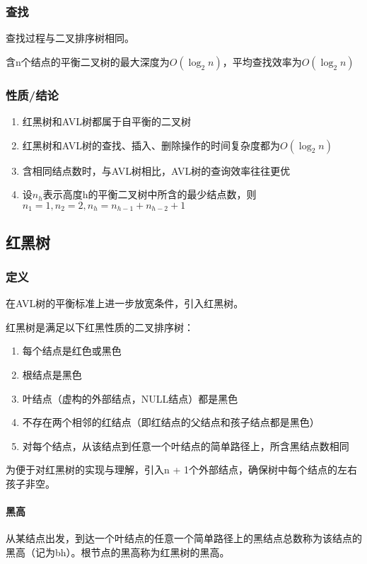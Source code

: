 \subsubsection{查找}
查找过程与二叉排序树相同。

含n个结点的平衡二叉树的最大深度为\(O(\log_2n)\)，平均查找效率为\(O(\log_2n)\)

\subsubsection{性质/结论}
\begin{enumerate}
    \item 红黑树和AVL树都属于自平衡的二叉树
    \item 红黑树和AVL树的查找、插入、删除操作的时间复杂度都为\(O(\log_2n)\)
    \item 含相同结点数时，与AVL树相比，AVL树的查询效率往往更优
    \item 设\(n_h\)表示高度h的平衡二叉树中所含的最少结点数，则\(n_1 = 1, n_2 = 2, n_h = n_{h - 1} + n_{h - 2} + 1\)
\end{enumerate}


\subsection{红黑树}\label{红黑树}
\subsubsection{定义}
在AVL树的平衡标准上进一步放宽条件，引入红黑树。

红黑树是满足以下红黑性质的二叉排序树：
\begin{enumerate}
    \item 每个结点是红色或黑色
    \item 根结点是黑色
    \item 叶结点（虚构的外部结点，NULL结点）都是黑色
    \item 不存在两个相邻的红结点（即红结点的父结点和孩子结点都是黑色）
    \item 对每个结点，从该结点到任意一个叶结点的简单路径上，所含黑结点数相同
\end{enumerate}
为便于对红黑树的实现与理解，引入n + 1个外部结点，确保树中每个结点的左右孩子非空。

\paragraph{黑高}
从某结点出发，到达一个叶结点的任意一个简单路径上的黑结点总数称为该结点的黑高（记为bh）。根节点的黑高称为红黑树的黑高。


